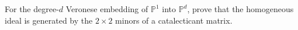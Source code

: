 \begin{problem}\label{chal:vi38-02}
For the degree-\(d\) Veronese embedding of \(\mathbb P^1\) into \(\mathbb P^d\), prove that the homogeneous ideal is generated by the \(2\times2\) minors of a catalecticant matrix.
\end{problem}
